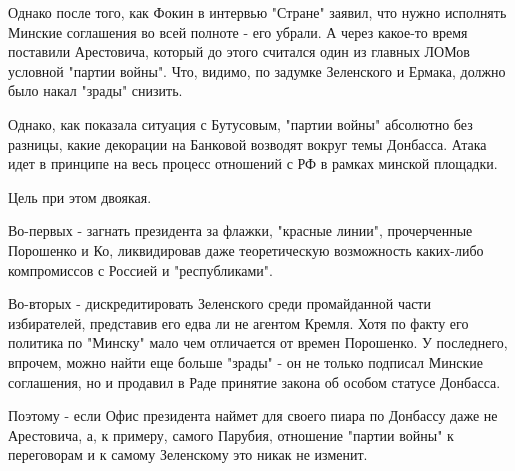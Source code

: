 Однако после того, как Фокин в интервью "Стране"
заявил,
что нужно исполнять Минские соглашения во всей полноте - его убрали. А через
какое-то время поставили Арестовича, который до этого считался один из главных
ЛОМов условной "партии войны". Что, видимо, по задумке Зеленского и Ермака,
должно было накал "зрады" снизить. 

Однако, как показала ситуация с Бутусовым, "партии войны" абсолютно без
разницы, какие декорации на Банковой возводят вокруг темы Донбасса. Атака
идет в принципе на весь процесс отношений с РФ в рамках минской площадки.

Цель при этом двоякая.

Во-первых - загнать президента за флажки, "красные линии", прочерченные
Порошенко и Ко, ликвидировав даже теоретическую возможность каких-либо
компромиссов с Россией и "республиками". 

Во-вторых - дискредитировать Зеленского среди промайданной части
избирателей, представив его едва ли не агентом Кремля. Хотя по факту его
политика по "Минску" мало чем отличается от времен Порошенко. У
последнего, впрочем, можно найти еще больше "зрады" - он не только
подписал Минские соглашения, но и продавил в Раде принятие закона об
особом статусе Донбасса. 

Поэтому - если Офис президента наймет для своего пиара по Донбассу даже не
Арестовича, а, к примеру, самого Парубия, отношение "партии войны" к
переговорам и к самому Зеленскому это никак не изменит.
